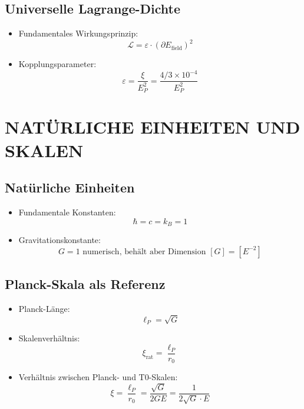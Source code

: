 \documentclass[12pt,a4paper]{article}
\begin{document}
	\subsection{Universelle Lagrange-Dichte}
	\begin{itemize}
		\item Fundamentales Wirkungsprinzip:
		$$\boxed{\mathcal{L} = \varepsilon \cdot (\partial E_{\text{field}})^2}$$
		
		\item Kopplungsparameter:
		$$\varepsilon = \frac{\xi}{E_P^2} = \frac{4/3 \times 10^{-4}}{E_P^2}$$
	\end{itemize}
	
	\section{NAT\"{U}RLICHE EINHEITEN UND SKALEN}
	
	\subsection{Nat\"{u}rliche Einheiten}
	\begin{itemize}
		\item Fundamentale Konstanten:
		$$\hbar = c = k_B = 1$$
		
		\item Gravitationskonstante:
		$$G = 1 \text{ numerisch, beh\"{a}lt aber Dimension } [G] = [E^{-2}]$$
	\end{itemize}
	

	\subsection{Planck-Skala als Referenz}
\begin{itemize}
	\item Planck-L\"{a}nge:
	$$\ell_P = \sqrt{G}$$
	
	\item Skalenverh\"{a}ltnis:
	$$\xi_{\text{rat}} = \frac{\ell_P}{r_0}$$
	
	\item Verh\"{a}ltnis zwischen Planck- und T0-Skalen:
	$$\xi = \frac{\ell_P}{r_0} = \frac{\sqrt{G}}{2GE} = \frac{1}{2\sqrt{G} \cdot E}$$
\end{itemize}
	
\end{document}
